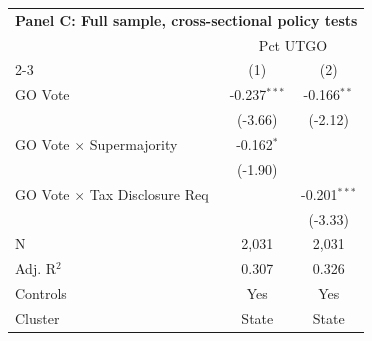 \begingroup
\centering
\begin{tabular*}{\textwidth}{@{\extracolsep{\fill}}lcc}
\multicolumn{3}{l}{\textbf{Panel C: Full sample, cross-sectional policy tests}}\\

\addlinespace
   \toprule
    & \multicolumn{2}{c}{Pct UTGO}\\
   \cmidrule(lr){2-3}
                                        & (1)            & (2)\\  
   \midrule 
   GO Vote                              & -0.237$^{***}$ & -0.166$^{**}$\\   
                                        & (-3.66)       & (-2.12)\\   
   GO Vote $\times$ Supermajority       & -0.162$^{*}$   &   \\   
                                        & (-1.90)       &   \\   
   GO Vote $\times$ Tax Disclosure Req  &                & -0.201$^{***}$\\   
                                        &                & (-3.33)\\   
   \hline
   N                         & 2,031          & 2,031\\  
   Adj. R$^2$                       & 0.307          & 0.326\\  
   Controls                   & Yes            & Yes\\
   Cluster              & State & State\\  
   \bottomrule
\end{tabular*}
\par\endgroup
